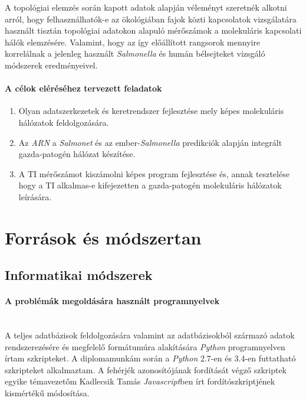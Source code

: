 \documentclass[a4paper,12pt]{article}
\begin{document}
	A topológiai elemzés során kapott adatok alapján véleményt szeretnék alkotni arról, hogy felhasználhatók-e az ökológiában fajok közti kapcsolatok vizsgálatára használt tisztán topológiai adatokon alapuló mérőszámok a molekuláris kapcsolati hálók elemzésére. Valamint, hogy az így előállított rangsorok mennyire korrelálnak a jelenleg használt \textit{Salmonella} és humán bélsejteket vizsgáló módszerek eredményeivel.

	\paragraph{A célok eléréséhez tervezett feladatok}
	\begin{enumerate}
		\item Olyan adatszerkezetek és keretrendszer fejlesztése mely képes molekuláris hálózatok feldolgozására.
		\item Az \textit{ARN} a \textit{Salmonet} és az  ember-\textit{Salmonella} predikciók alapján integrált gazda-patogén hálózat készítése.
		\item A TI mérőszámot kiszámolni képes program fejlesztése és, annak tesztelése hogy a TI alkalmas-e kifejezetten a gazda-patogén molekuláris hálózatok leírására.
	\end{enumerate}
	\pagebreak

\section{Források és módszertan}

	\subsection{Informatikai módszerek}
			\paragraph{A problémák megoldására használt programnyelvek} \mbox{}\\
			A teljes adatbázisok feldolgozására valamint az adatbázisokból származó adatok rendszerezésére és megfelelő formátumúra alakítására \textit{Python} programnyelven írtam szkripteket. A diplomamunkám során a \textit{Python} 2.7-en és 3.4-en futtatható szkripteket alkalmaztam. A fehérjék azonosítójának fordítását végző szkriptek egyike témavezetőm Kadlecsik Tamás \textit{Javascript}ben írt fordítószkriptjének kismértékű módosítása.
			
\end{document}
